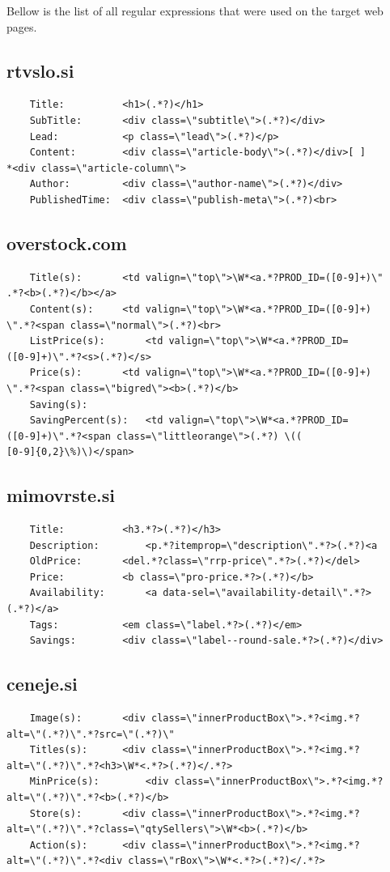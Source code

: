 \documentclass[9pt]{IEEEtran}
\begin{document}
Bellow is the list of all regular expressions that were used on the target web pages.

\subsection{rtvslo.si}
\begin{verbatim}
	Title: 			<h1>(.*?)</h1>
	SubTitle:		<div class=\"subtitle\">(.*?)</div>
	Lead:			<p class=\"lead\">(.*?)</p>
	Content:		<div class=\"article-body\">(.*?)</div>[ ]
*<div class=\"article-column\">
	Author: 		<div class=\"author-name\">(.*?)</div>
	PublishedTime:	<div class=\"publish-meta\">(.*?)<br>
\end{verbatim}

\subsection{overstock.com}
\begin{verbatim}
	Title(s):		<td valign=\"top\">\W*<a.*?PROD_ID=([0-9]+)\"
.*?<b>(.*?)</b></a>
	Content(s):		<td valign=\"top\">\W*<a.*?PROD_ID=([0-9]+)
\".*?<span class=\"normal\">(.*?)<br>	
	ListPrice(s):		<td valign=\"top\">\W*<a.*?PROD_ID=
([0-9]+)\".*?<s>(.*?)</s>
	Price(s):		<td valign=\"top\">\W*<a.*?PROD_ID=([0-9]+)
\".*?<span class=\"bigred\"><b>(.*?)</b>
	Saving(s):
	SavingPercent(s):	<td valign=\"top\">\W*<a.*?PROD_ID=
([0-9]+)\".*?<span class=\"littleorange\">(.*?) \((
[0-9]{0,2}\%)\)</span>		
\end{verbatim}

\subsection{mimovrste.si}
\begin{verbatim}
	Title:			<h3.*?>(.*?)</h3>
	Description:		<p.*?itemprop=\"description\".*?>(.*?)<a
	OldPrice:		<del.*?class=\"rrp-price\".*?>(.*?)</del>
	Price:			<b class=\"pro-price.*?>(.*?)</b>
	Availability:		<a data-sel=\"availability-detail\".*?>
(.*?)</a>
	Tags:			<em class=\"label.*?>(.*?)</em>
	Savings:		<div class=\"label--round-sale.*?>(.*?)</div>
\end{verbatim}

\subsection{ceneje.si}
\begin{verbatim}
	Image(s):		<div class=\"innerProductBox\">.*?<img.*?
alt=\"(.*?)\".*?src=\"(.*?)\"
	Titles(s):		<div class=\"innerProductBox\">.*?<img.*?
alt=\"(.*?)\".*?<h3>\W*<.*?>(.*?)</.*?>
	MinPrice(s):		<div class=\"innerProductBox\">.*?<img.*?
alt=\"(.*?)\".*?<b>(.*?)</b>
	Store(s):		<div class=\"innerProductBox\">.*?<img.*?
alt=\"(.*?)\".*?class=\"qtySellers\">\W*<b>(.*?)</b>
	Action(s):		<div class=\"innerProductBox\">.*?<img.*?
alt=\"(.*?)\".*?<div class=\"rBox\">\W*<.*?>(.*?)</.*?>
\end{verbatim}
\end{document}

